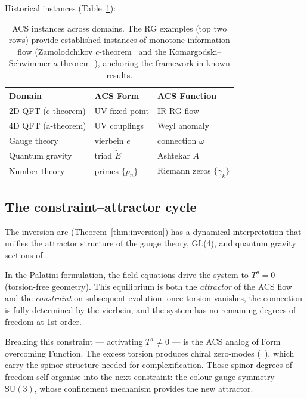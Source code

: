 \documentclass[11pt,a4paper]{article}
\theoremstyle{plain}
\theoremstyle{definition}
\theoremstyle{remark}
\begin{document}
\noindent
Historical instances (Table~\ref{tab:acs-instances}):

\begin{table}[h]
\centering
\begin{tabular}{lll}
\toprule
Domain & ACS Form & ACS Function \\
\midrule
2D QFT (c-theorem) & UV fixed point & IR RG flow \\
4D QFT (a-theorem) & UV couplings & Weyl anomaly \\
Gauge theory & vierbein $e$ & connection $\omega$ \\
Quantum gravity & triad $\tilde{E}$ & Ashtekar $A$ \\
Number theory & primes $\{p_n\}$ & Riemann zeros $\{\gamma_k\}$ \\
\bottomrule
\end{tabular}
\caption{ACS instances across domains.  The RG examples (top two rows) provide
established instances of monotone information flow (Zamolodchikov $c$-theorem~\cite{Zamolodchikov1986} and the
Komargodski--Schwimmer $a$-theorem~\cite{KomargodskiSchwimmer2011}), anchoring the framework in known results.}
\label{tab:acs-instances}
\end{table}

\subsection{The constraint--attractor cycle}
\label{sec:constraint}

The inversion arc (Theorem~\ref{thm:inversion}) has a dynamical interpretation
that unifies the attractor structure of the gauge theory, GL(4), and
quantum gravity sections of~\cite{Wallace2026a}.

In the Palatini formulation, the field equations drive the system
to $T^a = 0$ (torsion-free geometry).  This equilibrium is both
the \emph{attractor} of the ACS flow and the \emph{constraint}
on subsequent evolution: once torsion vanishes, the connection is
fully determined by the vierbein, and the system has no remaining
degrees of freedom at 1st order.

Breaking this constraint --- activating $T^a \neq 0$ --- is the
ACS analog of Form overcoming Function.  The excess torsion produces
chiral zero-modes (~\cite{Wallace2026a}), which carry the spinor
structure needed for complexification.  Those spinor degrees of
freedom self-organise into the next constraint: the colour gauge
symmetry $\mathrm{SU}(3)$, whose confinement mechanism provides
the new attractor.
\end{document}
